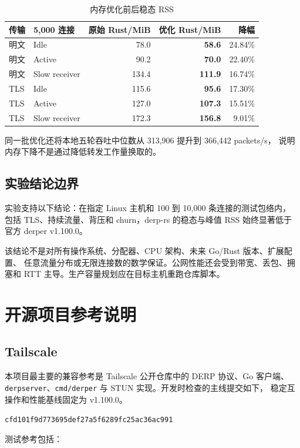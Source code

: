 \documentclass[UTF8,a4paper,zihao=-4]{ctexart}
\newcommand{\code}[1]{\texttt{\small #1}}
\newcommand{\metric}[1]{\textcolor{Primary}{\textbf{#1}}}
\begin{document}
\begin{table}[htbp]
\centering
\small
\begin{tabular}{llrrr}
\toprule
\textbf{传输} & \textbf{5,000 连接} &
\textbf{原始 Rust/MiB} & \textbf{优化 Rust/MiB} & \textbf{降幅} \\
\midrule
明文 & Idle          & 78.0  & \metric{58.6}  & 24.84\% \\
明文 & Active        & 90.2  & \metric{70.0}  & 22.40\% \\
明文 & Slow receiver & 134.4 & \metric{111.9} & 16.74\% \\
TLS & Idle           & 115.6 & \metric{95.6}  & 17.30\% \\
TLS & Active         & 127.0 & \metric{107.3} & 15.51\% \\
TLS & Slow receiver  & 172.3 & \metric{156.8} & 9.01\% \\
\bottomrule
\end{tabular}
\caption{内存优化前后稳态 RSS}
\end{table}

同一批优化还将本地五轮吞吐中位数从 313,906 提升到 366,442 packets/s，
说明内存下降不是通过降低转发工作量换取的。

\subsection{实验结论边界}

实验支持以下结论：在指定 Linux 主机和 100 到 10,000 条连接的测试包络内，
包括 TLS、持续流量、背压和 churn，derp-rs 的稳态与峰值 RSS 始终显著低于
官方 derper v1.100.0。

该结论不是对所有操作系统、分配器、CPU 架构、未来 Go/Rust 版本、扩展配置、
任意流量分布或无限连接数的数学保证。公网性能还会受到带宽、丢包、拥塞和 RTT
主导。生产容量规划应在目标主机重跑仓库脚本。

\section{开源项目参考说明}

\subsection{Tailscale}

本项目最主要的兼容参考是 Tailscale 公开仓库中的 DERP 协议、Go 客户端、
\code{derpserver}、\code{cmd/derper} 与 STUN 实现。开发时检查的主线提交如下，
稳定互操作和性能基线固定为 v1.100.0。
\begin{center}
\code{cfd101f9d773695def27a5f6289fc25ac36ac991}
\end{center}
测试参考包括：
\end{document}
